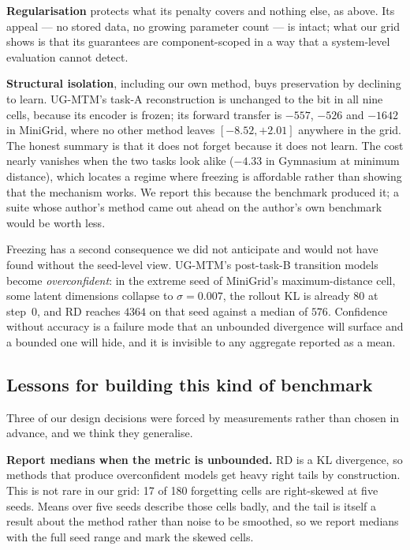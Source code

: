 \textbf{Regularisation} protects what its penalty covers and nothing else, as
above. Its appeal --- no stored data, no growing parameter count --- is intact; what
our grid shows is that its guarantees are component-scoped in a way that a
system-level evaluation cannot detect.

\textbf{Structural isolation}, including our own method, buys preservation by
declining to learn. UG-MTM's task-A reconstruction is unchanged to the bit in all
nine cells, because its encoder is frozen; its forward transfer is $-557$, $-526$
and $-1642$ in MiniGrid, where no other method leaves $[-8.52, +2.01]$ anywhere
in the grid. The honest summary is that it does not forget because it does not
learn. The cost nearly vanishes when the two tasks look alike ($-4.33$ in
Gymnasium at minimum distance), which locates a regime where freezing is
affordable rather than showing that the mechanism works. We report this because
the benchmark produced it; a suite whose author's method came out ahead on the
author's own benchmark would be worth less.

Freezing has a second consequence we did not anticipate and would not have found
without the seed-level view. UG-MTM's post-task-B transition models become
\emph{overconfident}: in the extreme seed of MiniGrid's maximum-distance cell,
some latent dimensions collapse to $\sigma = 0.007$, the rollout KL is already
$80$ at step~0, and RD reaches $4364$ on that seed against a median of $576$. Confidence
without accuracy is a failure mode that an unbounded divergence will surface and
a bounded one will hide, and it is invisible to any aggregate reported as a mean.

\subsection{Lessons for building this kind of benchmark}
\label{sec:discussion:measurement}

Three of our design decisions were forced by measurements rather than chosen in
advance, and we think they generalise.

\textbf{Report medians when the metric is unbounded.} RD is a KL divergence, so
methods that produce overconfident models get heavy right tails by construction.
This is not rare in our grid: 17 of 180 forgetting cells are right-skewed at
five seeds. Means over five seeds describe those cells badly, and the tail is
itself a result about the method rather than noise to be smoothed, so we report
medians with the full seed range and mark the skewed cells.

